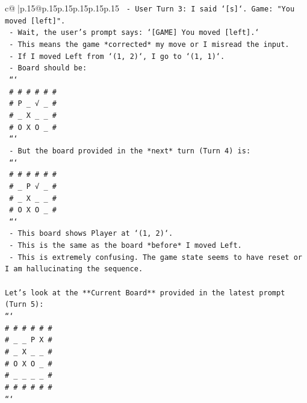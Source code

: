 \documentclass{article}
\begin{document}
{\begin{supertabular}{c@{$\;$}|p{.15\linewidth}@{}p{.15\linewidth}p{.15\linewidth}p{.15\linewidth}p{.15\linewidth}p{.15\linewidth}}
{{{\texttt{    {-} User Turn 3: I said `{[}s{]}`. Game: "You moved {[}left{]}".} \\
\texttt{      {-} Wait, the user's prompt says: `{[}GAME{]} You moved {[}left{]}.`} \\
\texttt{      {-} This means the game *corrected* my move or I misread the input.} \\
\texttt{      {-} If I moved Left from `(1, 2)`, I go to `(1, 1)`.} \\
\texttt{      {-} Board should be:} \\
\texttt{        ```} \\
\texttt{        \# \# \# \# \# \#} \\
\texttt{        \# P \_ √ \_ \#} \\
\texttt{        \# \_ X \_ \_ \#} \\
\texttt{        \# O X O \_ \#} \\
\texttt{        ```} \\
\texttt{      {-} But the board provided in the *next* turn (Turn 4) is:} \\
\texttt{        ```} \\
\texttt{        \# \# \# \# \# \#} \\
\texttt{        \# \_ P √ \_ \#} \\
\texttt{        \# \_ X \_ \_ \#} \\
\texttt{        \# O X O \_ \#} \\
\texttt{        ```} \\
\texttt{      {-} This board shows Player at `(1, 2)`.} \\
\texttt{      {-} This is the same as the board *before* I moved Left.} \\
\texttt{      {-} This is extremely confusing. The game state seems to have reset or I am hallucinating the sequence.} \\
\\ 
\texttt{Let's look at the **Current Board** provided in the latest prompt (Turn 5):} \\
\texttt{```} \\
\texttt{\# \# \# \# \# \#} \\
\texttt{\# \_ \_ P X \#} \\
\texttt{\# \_ X \_ \_ \#} \\
\texttt{\# O X O \_ \#} \\
\texttt{\# \_ \_ \_ \_ \#} \\
\texttt{\# \# \# \# \# \#} \\
\texttt{```} \\
}}}
\end{supertabular}}
\end{document}
